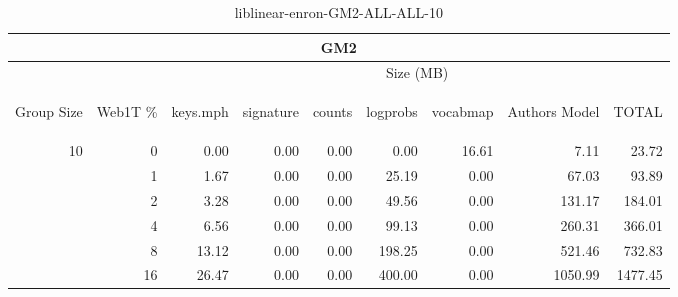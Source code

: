 \begin{center}
\begin{table}[htbp]
\begin{tabular}{ | r | r | r | r | r | r | r | r | r |}
\hline
\multicolumn{9}{|c|}{GM2}\\
\hline
 & & \multicolumn{7}{|c|}{Size (MB)}\\ \cline{3-9}
\begin{sideways}Group Size\end{sideways} & \begin{sideways}Web1T \% \end{sideways} & \begin{sideways}keys.mph\end{sideways} & \begin{sideways}signature\end{sideways} & \begin{sideways}counts\end{sideways} & \begin{sideways}logprobs\end{sideways} & \begin{sideways}vocabmap\end{sideways} & \begin{sideways}Authors Model \end{sideways} & \begin{sideways}TOTAL\end{sideways}\\
\hline
\multirow{5}{*}{10}
 & 0 & 0.00 & 0.00 & 0.00 & 0.00 & 16.61 & 7.11 & 23.72\\ \cline{2-9}
 & 1 & 1.67 & 0.00 & 0.00 & 25.19 & 0.00 & 67.03 & 93.89\\ \cline{2-9}
 & 2 & 3.28 & 0.00 & 0.00 & 49.56 & 0.00 & 131.17 & 184.01\\ \cline{2-9}
 & 4 & 6.56 & 0.00 & 0.00 & 99.13 & 0.00 & 260.31 & 366.01\\ \cline{2-9}
 & 8 & 13.12 & 0.00 & 0.00 & 198.25 & 0.00 & 521.46 & 732.83\\ \cline{2-9}
 & 16 & 26.47 & 0.00 & 0.00 & 400.00 & 0.00 & 1050.99 & 1477.45\\ \cline{2-9}
\hline
\end{tabular}
\caption{liblinear-enron-GM2-ALL-ALL-10}
\label{table:liblinear-enron-GM2-ALL-ALL-10}
\end{table}
\end{center}


